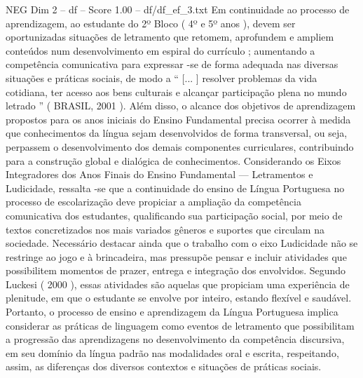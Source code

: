 \begin{textsample}{NEG Dim 2 – df – Score 1.00 – df/df\_ef\_3.txt}
Em continuidade ao processo de aprendizagem, ao estudante do 2º Bloco ( 4º e 5º anos ), devem ser oportunizadas situações de letramento que retomem, aprofundem e ampliem conteúdos num desenvolvimento em espiral do currículo ; aumentando a competência comunicativa para expressar -se de forma adequada nas diversas situações e práticas sociais, de modo a “ [... ] resolver problemas da vida cotidiana, ter acesso aos bens culturais e alcançar participação plena no mundo letrado ” ( BRASIL, 2001 ).
Além disso, o alcance dos objetivos de aprendizagem propostos para os anos iniciais do Ensino Fundamental precisa ocorrer à medida que conhecimentos da língua sejam desenvolvidos de forma transversal, ou seja, perpassem o desenvolvimento dos demais componentes curriculares, contribuindo para a construção global e dialógica de conhecimentos.
Considerando os Eixos Integradores dos Anos Finais do Ensino Fundamental — Letramentos e Ludicidade, ressalta -se que a continuidade do ensino de Língua Portuguesa no processo de escolarização deve propiciar a ampliação da competência comunicativa dos estudantes, qualificando sua participação social, por meio de textos concretizados nos mais variados gêneros e suportes que circulam na sociedade.
Necessário destacar ainda que o trabalho com o eixo Ludicidade não se restringe ao jogo e à brincadeira, mas pressupõe pensar e incluir atividades que possibilitem momentos de prazer, entrega e integração dos envolvidos.
Segundo Luckesi ( 2000 ), essas atividades são aquelas que propiciam uma experiência de plenitude, em que o estudante se envolve por inteiro, estando flexível e saudável.
Portanto, o processo de ensino e aprendizagem da Língua Portuguesa implica considerar as práticas de linguagem como eventos de letramento que possibilitam a progressão das aprendizagens no desenvolvimento da competência discursiva, em seu domínio da língua padrão nas modalidades oral e escrita, respeitando, assim, as diferenças dos diversos contextos e situações de práticas sociais.

\end{textsample}
